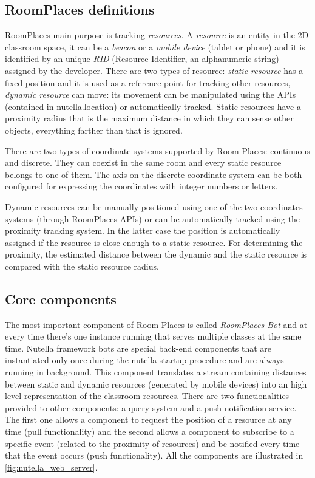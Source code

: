 \subsection{RoomPlaces definitions}

RoomPlaces main purpose is tracking \textit{resources}. A \textit{resource} is an entity in the 2D classroom space, it can be a \textit{beacon} or a \textit{mobile device} (tablet or phone) and it is identified by an unique \textit{RID} (Resource Identifier, an alphanumeric string) assigned by the developer. There are two types of resource: \textit{static resource} has a fixed position and it is used as a reference point for tracking other resources, \textit{dynamic resource} can move: its movement can be manipulated using the APIs (contained in nutella.location) or automatically tracked. Static resources have a proximity radius that is the maximum distance in which they can sense other objects, everything farther than that is ignored.

There are two types of coordinate systems supported by Room Places: continuous and discrete. They can coexist in the same room and every static resource belongs to one of them. The axis on the discrete coordinate system can be both configured for expressing the coordinates with integer numbers or letters.

Dynamic resources can be manually positioned using one of the two coordinates systems (through RoomPlaces APIs) or can be automatically tracked using the proximity tracking system. In the latter case the position is automatically assigned if the resource is close enough to a static resource. For determining the proximity, the estimated distance between the dynamic and the static resource is compared with the static resource radius.

\subsection{Core components}
The most important component of Room Places is called \textit{RoomPlaces Bot} and at every time there's one instance running that serves multiple classes at the same time. Nutella framework bots are special back-end components that are instantiated only once during the nutella startup procedure and are always running in background. This component translates a stream containing distances between static and dynamic resources (generated by mobile devices) into an high level representation of the classroom resources. There are two functionalities provided to other components: a query system and a push notification service. The first one allows a component to request the position of a resource at any time (pull functionality) and the second allows a component to subscribe to a specific event (related to the proximity of resources) and be notified every time that the event occurs (push functionality). All the components are illustrated in \ref{fig:nutella_web_server}.

